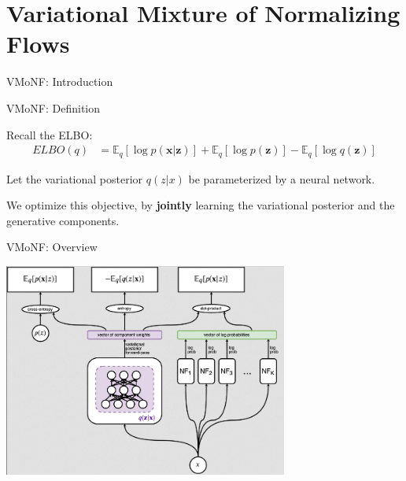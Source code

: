 \documentclass[12pt,ignorenonframetext,]{beamer}
\begin{document}
\hypertarget{variational-mixture-of-normalizing-flows}{%
\section{Variational Mixture of Normalizing
Flows}\label{variational-mixture-of-normalizing-flows}}

\begin{frame}{VMoNF: Introduction}
\protect\hypertarget{vmonf-introduction}{}


\end{frame}

\begin{frame}{VMoNF: Definition}
\protect\hypertarget{vmonf-definition}{}

Recall the ELBO: \begin{align*}
    ELBO(q) &= \mathbb{E}_q [\log p(\bm{x}|\bm{z})] + \mathbb{E}_q [\log p(\bm{z})] - \mathbb{E}_q [\log q(\bm{z})]
\end{align*}

\pause

Let the variational posterior \(q(z|x)\) be parameterized by a neural
network.

\pause

We optimize this objective, by \textbf{jointly} learning the variational
posterior and the generative components.

\end{frame}

\begin{frame}{VMoNF: Overview}
\protect\hypertarget{vmonf-overview}{}

\centering

\includegraphics[width=0.7\textwidth]{figures/train_overview.png}

\end{frame}
\end{document}
